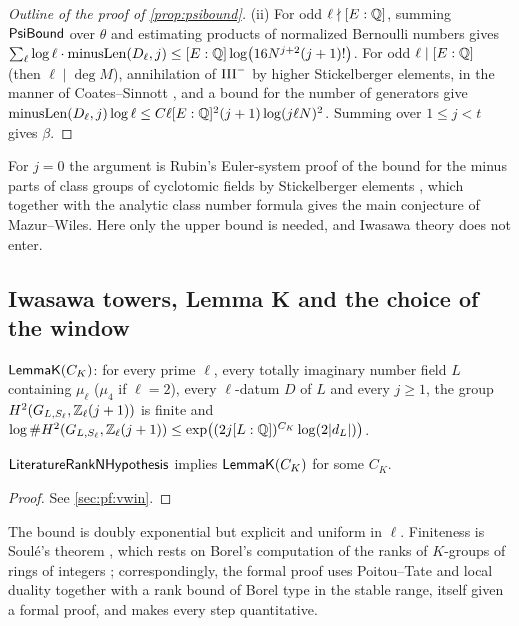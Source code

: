 \begin{proof}[Outline of the proof of \cref{prop:psibound}]
(ii) For odd $\ell\nmid[E:\mathbb{Q}]$, summing $\mathsf{PsiBound}$ over $\theta$ and estimating products of normalized
Bernoulli numbers gives $\sum_\ell\log\ell\cdot\mathrm{minusLen}(D_\ell,j)\le[E:\mathbb{Q}]\log\bigl(16N^{j+2}(j+1)!\bigr)$. For
odd $\ell\mid[E:\mathbb{Q}]$ (then $\ell\mid\deg M$), annihilation of $\mathrm{III}^-$ by higher Stickelberger elements, in the manner
of Coates--Sinnott \cite{CoatesSinnott1974}, and a bound for the number of generators give
$\mathrm{minusLen}(D_\ell,j)\log\ell\le C\ell[E:\mathbb{Q}]^2(j+1)\log(j\ell N)^2$. Summing over $1\le j<t$ gives $\beta$.
\end{proof}

For $j=0$ the argument is Rubin's Euler-system proof of the bound for the minus parts of class groups of cyclotomic
fields by Stickelberger elements \cite{Rubin1990}, which together with the analytic class number formula gives the
main conjecture of Mazur--Wiles. Here only the upper bound is needed, and Iwasawa theory does not enter.

\subsection{Iwasawa towers, Lemma K and the choice of the window}\label{sec:window:towers}

\begin{definition}\label{def:window:lemmaK}
$\mathsf{LemmaK}(C_K)$: for every prime $\ell$, every totally imaginary number field $L$ containing $\mu_\ell$
($\mu_4$ if $\ell=2$), every $\ell$-datum $D$ of $L$ and every $j\ge1$, the group $H^2(G_{L,S_\ell},\mathbb{Z}_\ell(j+1))$ is finite
and $\log\#H^2(G_{L,S_\ell},\mathbb{Z}_\ell(j+1))\le\exp\bigl((2j[L:\mathbb{Q}])^{C_K}\log(2|d_L|)\bigr)$.
\end{definition}

\begin{theorem}[Lemma K]\Fmark\label{thm:window:lemmaK}
$\mathsf{LiteratureRankNHypothesis}$ implies $\mathsf{LemmaK}(C_K)$ for some $C_K$.
\end{theorem}
\begin{proof}See \cref{sec:pf:vwin}.
\end{proof}


The bound is doubly exponential but explicit and uniform in $\ell$. Finiteness is Soul\'e's theorem
\cite{Soule1979}, which rests on Borel's computation of the ranks of $K$-groups of rings of integers
\cite{Borel1974}; correspondingly, the formal proof uses Poitou--Tate and local duality together with a rank bound
of Borel type in the stable range, itself given a formal proof, and makes every step quantitative.

